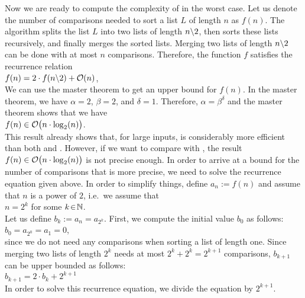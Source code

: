\noindent
Now we are ready to compute the complexity of  in the worst case.  Let us denote
the number of comparisons needed to sort a list $L$ of length $n$ as $f(n)$.  The algorithm  
splits the list $L$ into two lists of length $n\symbol{92}2$, then sorts these lists recursively,
and finally merges the sorted lists.  Merging two lists of length $n \symbol{92}2$ can be done with
at most $n$ comparisons.  Therefore, the function $f$ satisfies the recurrence relation
\\[0.2cm]
\hspace*{1.3cm}
$f(n) = 2 \cdot f(n \symbol{92} 2) + \Oh(n)$,
\\[0.2cm]
We can use the master theorem to get an upper bound for $f(n)$.  In the master theorem, we have
$\alpha = 2$, $\beta = 2$, and $\delta = 1$. Therefore, $\alpha = \beta^\delta$ and the master
theorem shows that we have
\\[0.2cm]
\hspace*{1.3cm}
$f(n) \in \mathcal{O}\bigl(n \cdot \log_2(n) \bigr)$.
\\[0.2cm]
This result already shows that, for large inputs,  is considerably more efficient
than both  and .  However, if we want to compare
 with , the result $f(n) \in \mathcal{O}\bigl(n \cdot \log_2(n) \bigr)$ is
not precise enough.  In order to arrive at a bound for the number of comparisons that is more precise,
we need to solve the recurrence equation given above.  In order to simplify things,  define $a_n := f(n)$ 
and assume that $n$ is a power of $2$, i.e.~we assume that
\\[0.2cm]
\hspace*{1.3cm}
$\displaystyle n = 2^k$ \qquad for some $k \!\in\! \mathbb{N}$.
\\[0.2cm]
Let us define $b_k := a_n = a_{2^k}$.  First, we compute the initial value $b_0$ as follows:
\\[0.2cm]
\hspace*{1.3cm}
$\displaystyle b_0 = a_{2^0} = a_1 = 0$,
\\[0.2cm]
since we do not need any comparisons when sorting a list of length one.  Since merging two lists of
length $2^k$ needs at most  $2^k + 2^k = 2^{k+1}$ comparisons, $b_{k+1}$ can be upper bounded as follows:
\\[0.2cm]
\hspace*{1.3cm}
$b_{k+1} = 2 \cdot b_k + 2^{k+1}$ 
\\[0.2cm]
In order to solve this recurrence equation, we divide the equation by $2^{k+1}$.
